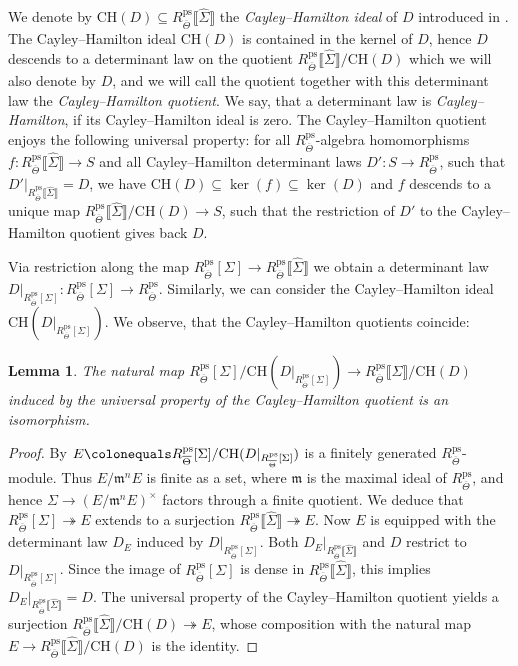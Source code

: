 \documentclass{amsart}
\newtheorem{lem}[prop]{Lemma}
\theoremstyle{definition}
\theoremstyle{remark}
\newcommand{\mm}{\mathfrak m}
\newcommand{\br}[1]{\llbracket #1\rrbracket}
\newcommand{\CH}{\mathrm{CH}}
\newcommand{\Thetabar}{\overline{\Theta}}
\newcommand{\ps}{\mathrm{ps}}
\newcommand{\Sigmahat}{\widehat{\Sigma}}
\begin{document}
We denote by $\CH(D) \subseteq R^{\ps}_{\Thetabar}\br{\Sigmahat}$ the \emph{Cayley--Hamilton ideal} of $D$ introduced in \cite[Section 1.17]{che_durham}.
The Cayley--Hamilton ideal $\CH(D)$ is contained in the kernel of $D$, hence $D$ descends to a determinant law on the quotient $R^{\ps}_{\Thetabar}\br{\Sigmahat}/\CH(D)$ \cite[Lemma 1.21]{che_durham} which we will also denote by $D$, and we will call the quotient together with this determinant law the \emph{Cayley--Hamilton quotient}. We say, that a determinant law is \emph{Cayley--Hamilton}, if its Cayley--Hamilton ideal is zero. The Cayley--Hamilton quotient enjoys the following universal property: for all $R^{\ps}_{\Thetabar}$-algebra homomorphisms $f : R^{\ps}_{\Thetabar}\br{\Sigmahat} \to S$ and all Cayley--Hamilton determinant laws $D' : S \to R^{\ps}_{\Thetabar}$, such that $D'|_{R^{\ps}_{\Thetabar}\br{\Sigmahat}} = D$, we have $\CH(D) \subseteq \ker(f) \subseteq \ker(D)$ and $f$ descends to a unique map $R^{\ps}_{\Thetabar}\br{\Sigmahat}/\CH(D) \to S$, such that the restriction of $D'$ to the Cayley--Hamilton quotient gives back $D$.

Via restriction along the map 
$R^{\ps}_{\Thetabar}[\Sigma] \to R^{\ps}_{\Thetabar}\br{\Sigmahat}$ we obtain a determinant law $D|_{R^{\ps}_{\Thetabar}[\Sigma]} : R^{\ps}_{\Thetabar}[\Sigma] \to R^{\ps}_{\Thetabar}$.
Similarly, we can consider the Cayley--Hamilton ideal $\CH(D|_{R^{\ps}_{\Thetabar}[\Sigma]})$.
We observe, that the Cayley--Hamilton quotients coincide:

\begin{lem}\label{ident_CH_quotients}
    The natural map $R^{\ps}_{\Thetabar}[\Sigma]/\CH(D|_{R^{\ps}_{\Thetabar}[\Sigma]}) \to R^{\ps}_{\Thetabar}\br{\Sigmahat}/\CH(D)$ induced by the universal property of the Cayley--Hamilton quotient is an isomorphism.
\end{lem}

\begin{proof}
    By \cite[Proposition 2.13]{WE_alg} $E \colonequals R^{\ps}_{\Thetabar}[\Sigma]/\CH(D|_{R^{\ps}_{\Thetabar}[\Sigma]})$ is a finitely generated $R^{\ps}_{\Thetabar}$-module. Thus $E/\mm^n E$ is finite as a set, where $\mm$ is the maximal ideal of $R^{\ps}_{\Thetabar}$, and hence $\Sigma\rightarrow (E/\mm^n E)^{\times}$ factors through a finite quotient. We deduce that $R^{\ps}_{\Thetabar}[\Sigma]\twoheadrightarrow E$ extends  to a surjection $R^{\ps}_{\Thetabar}\br{\Sigmahat} \twoheadrightarrow E$.
    Now $E$ is equipped with the determinant law $D_E$ induced by $D|_{R^{\ps}_{\Thetabar}[\Sigma]}$.
    Both $D_E|_{R^{\ps}_{\Thetabar}\br{\Sigmahat}}$ and $D$ restrict to $D|_{R^{\ps}_{\Thetabar}[\Sigma]}$.
    Since the image of $R^{\ps}_{\Thetabar}[\Sigma]$ is dense in $R^{\ps}_{\Thetabar}\br{\Sigmahat}$, this implies $D_E|_{R^{\ps}_{\Thetabar}\br{\Sigmahat}} = D$.
    The universal property of the Cayley--Hamilton quotient yields a surjection $R^{\ps}_{\Thetabar}\br{\Sigmahat}/\CH(D) \twoheadrightarrow E$, whose composition with the natural map $E \to R^{\ps}_{\Thetabar}\br{\Sigmahat}/\CH(D)$ is the identity.
\end{proof}
\end{document}
